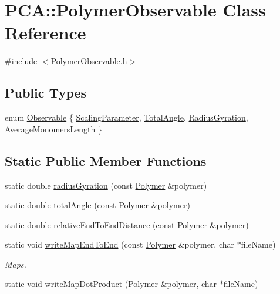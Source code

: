 \hypertarget{class_p_c_a_1_1_polymer_observable}{}\section{P\+CA\+:\+:Polymer\+Observable Class Reference}
\label{class_p_c_a_1_1_polymer_observable}


{\ttfamily \#include $<$Polymer\+Observable.\+h$>$}

\subsection*{Public Types}
\begin{DoxyCompactItemize}
\item 
enum \hyperlink{class_p_c_a_1_1_polymer_observable_a6dcabbc3bc249018c2c94825bff2c94f}{Observable} \{ \hyperlink{class_p_c_a_1_1_polymer_observable_a6dcabbc3bc249018c2c94825bff2c94fa0fbc808b6c1b04cd6cd30808354f2ac4}{Scaling\+Parameter}, 
\hyperlink{class_p_c_a_1_1_polymer_observable_a6dcabbc3bc249018c2c94825bff2c94fa9cc0a0c7f637afc18b27c94757dda4b9}{Total\+Angle}, 
\hyperlink{class_p_c_a_1_1_polymer_observable_a6dcabbc3bc249018c2c94825bff2c94fadeaff576492062c0c633ff9868907b43}{Radius\+Gyration}, 
\hyperlink{class_p_c_a_1_1_polymer_observable_a6dcabbc3bc249018c2c94825bff2c94fa9c3d1e4ed76d2bf6a991772bb58c7c1e}{Average\+Monomers\+Length}
 \}
\end{DoxyCompactItemize}
\subsection*{Static Public Member Functions}
\begin{DoxyCompactItemize}
\item 
static double \hyperlink{class_p_c_a_1_1_polymer_observable_afd34b4d18155d642009a3d3c73f40882}{radius\+Gyration} (const \hyperlink{class_p_c_a_1_1_polymer}{Polymer} \&polymer)
\item 
static double \hyperlink{class_p_c_a_1_1_polymer_observable_ae5b2dbf1d87aa54347f2a66bfb24e78b}{total\+Angle} (const \hyperlink{class_p_c_a_1_1_polymer}{Polymer} \&polymer)
\item 
static double \hyperlink{class_p_c_a_1_1_polymer_observable_a72ff49d3aed6660b0bd7a8175f3b436e}{relative\+End\+To\+End\+Distance} (const \hyperlink{class_p_c_a_1_1_polymer}{Polymer} \&polymer)
\item 
static void \hyperlink{class_p_c_a_1_1_polymer_observable_ac63e1b37da93eca84e21916f01279a59}{write\+Map\+End\+To\+End} (const \hyperlink{class_p_c_a_1_1_polymer}{Polymer} \&polymer, char $\ast$file\+Name)
\begin{DoxyCompactList}\small\item\em Maps. \end{DoxyCompactList}\item 
static void \hyperlink{class_p_c_a_1_1_polymer_observable_aa41850ca819c76bdceeb644e0a570c46}{write\+Map\+Dot\+Product} (\hyperlink{class_p_c_a_1_1_polymer}{Polymer} \&polymer, char $\ast$file\+Name)
\end{DoxyCompactItemize}



